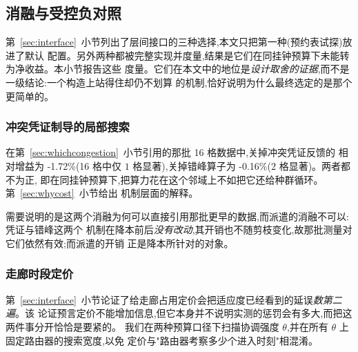\documentclass[manuscript,screen,review]{acmart}
\newcommand{\MatrixCells}{16}
\newcommand{\GainCertMatrix}{-1.72\%}    %
\newcommand{\GainStaggerMatrix}{-0.16\%} %
\begin{document}
\subsection{消融与受控负对照}
\label{sec:pricing}

第~\ref{sec:interface}~小节列出了层间接口的三种选择,本文只把第一种(预约表试探)放进了默认
配置。另外两种都被完整实现并度量,结果是它们在同挂钟预算下未能转为净收益。本小节报告这些
度量。它们在本文中的地位是\emph{设计取舍的证据},而不是一级结论:一个构造上站得住却仍不划算
的机制,恰好说明为什么最终选定的是那个更简单的。

\subsubsection{冲突凭证制导的局部搜索}
在第~\ref{sec:whichcongestion}~小节引用的那批 \MatrixCells{} 格数据中,关掉冲突凭证反馈的
相对增益为 \GainCertMatrix{}(\MatrixCells{} 格中仅 $1$ 格显著),关掉错峰算子为
\GainStaggerMatrix{}($2$ 格显著)。两者都不为正,
即在同挂钟预算下,把算力花在这个邻域上不如把它还给种群循环。第~\ref{sec:whycost}~小节给出
机制层面的解释。

需要说明的是这两个消融为何可以直接引用那批更早的数据,而派遣的消融不可以:凭证与错峰这两个
机制在降本前后\emph{没有改动},其开销也不随剪枝变化,故那批测量对它们依然有效;而派遣的开销
正是降本所针对的对象。

\subsubsection{走廊时段定价}
第~\ref{sec:interface}~小节论证了给走廊占用定价会把适应度已经看到的延误\emph{数第二遍}。该
论证预言定价不能增加信息,但它本身并不说明实测的惩罚会有多大,而把这两件事分开恰恰是要紧的。
我们在两种预算口径下扫描协调强度 $\theta$,并在所有 $\theta$ 上固定路由器的搜索宽度,以免
定价与"路由器考察多少个进入时刻"相混淆。
\end{document}
